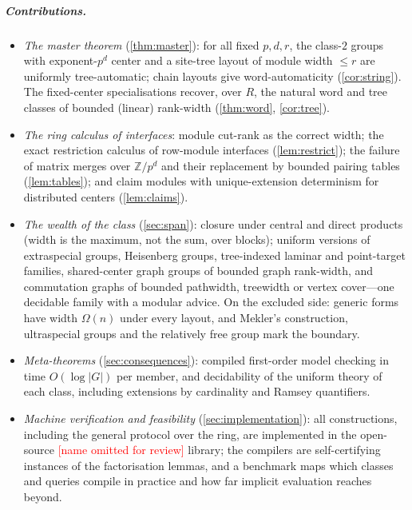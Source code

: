\documentclass[a4paper,UKenglish,autoref,anonymous]{lipics-v2021}
\newcommand{\ZZ}{\mathbb{Z}}
\newcommand{\R}{R}                                   %
\newcommand{\AutStr}{\textcolor{red}{[name omitted for review]}}
\newcommand{\AutStrCite}{}
\newcommand{\AutStr}{\textsf{AutStr}}
\newcommand{\AutStrCite}{~\cite{AutStr}}
\begin{document}
\subparagraph*{Contributions.}
\begin{itemize}
\item \emph{The master theorem} (\autoref{thm:master}): for all fixed $p,
  d, r$, the class-$2$ groups with exponent-$p^d$ center and a site-tree
  layout of module width $\le r$ are uniformly tree-automatic; chain
  layouts give word-automaticity (\autoref{cor:string}). The fixed-center
  specialisations recover, over $\R$, the natural word and tree classes of
  bounded (linear) rank-width (\autoref{thm:word}, \autoref{cor:tree}).
\item \emph{The ring calculus of interfaces}: module cut-rank as the
  correct width; the exact restriction calculus of row-module interfaces
  (\autoref{lem:restrict}); the failure of matrix merges over $\ZZ/p^d$
  and their replacement by bounded pairing tables (\autoref{lem:tables});
  and claim modules with unique-extension determinism for distributed
  centers (\autoref{lem:claims}).
\item \emph{The wealth of the class} (\autoref{sec:span}): closure under
  central and direct products (width is the maximum, not the sum, over
  blocks); uniform versions of extraspecial groups, Heisenberg groups,
  tree-indexed laminar and point-target families, shared-center graph
  groups of bounded graph rank-width, and commutation graphs of bounded
  pathwidth, treewidth or vertex cover---one decidable family with a
  modular advice. On the excluded side: generic forms have width
  $\Omega(n)$ under every layout, and Mekler's construction, ultraspecial
  groups and the relatively free group mark the boundary.
\item \emph{Meta-theorems} (\autoref{sec:consequences}): compiled
  first-order model checking in time $O(\log|G|)$ per member, and
  decidability of the uniform theory of each class, including extensions
  by cardinality and Ramsey quantifiers.
\item \emph{Machine verification and feasibility}
  (\autoref{sec:implementation}): all constructions, including the general
  protocol over the ring, are implemented in the open-source \AutStr{}
  library\AutStrCite{}; the compilers are self-certifying instances of the
  factorisation lemmas, and a benchmark maps which classes and queries
  compile in practice and how far implicit evaluation reaches beyond.
\end{itemize}
\end{document}
